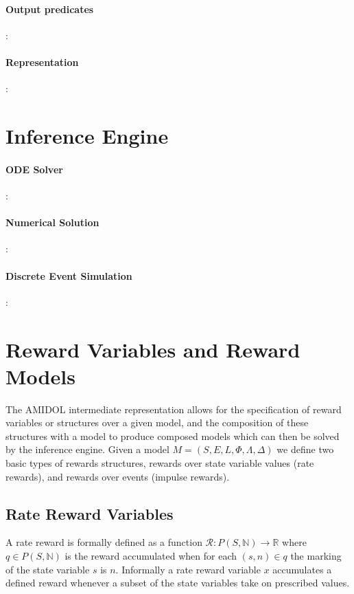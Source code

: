 \documentclass[11pt]{article}
\newcommand{\amidol}{\textsc{AMIDOL}}
\begin{document}
\paragraph{Output predicates}:

\paragraph{Representation}:

\section{Inference Engine}
\paragraph{ODE Solver}:

\paragraph{Numerical Solution}:

\paragraph{Discrete Event Simulation}:

\section{Reward Variables and Reward Models}

The \amidol{} intermediate representation allows for the specification of reward variables or structures over a given model, and the composition of these structures with a model to produce composed models which can then be solved by the inference engine.  Given a model $M = (S, E, L, \Phi, \Lambda, \Delta)$ we define two basic types of rewards structures, rewards over state variable values (rate rewards), and rewards over events (impulse rewards).

\cite{qureshi1996algorithms,deavours1999efficient,ciardo1996well,sanders1991reduced}

\subsection{Rate Reward Variables}

A rate reward is formally defined as a function $\mathcal{R}: P(S, \mathbb{N}) \rightarrow \mathbb{R}$ where $q \in P(S, \mathbb{N})$ is the reward accumulated when for each $(s,n) \in q$ the marking of the state variable $s$ is $n$.  Informally a rate reward variable $x$ accumulates a defined reward whenever a subset of the state variables take on prescribed values.
\end{document}
